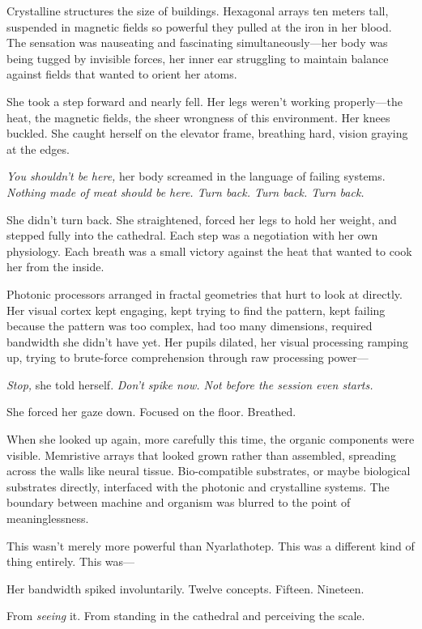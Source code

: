 Crystalline structures the size of buildings. Hexagonal arrays ten meters tall, suspended in magnetic fields so powerful they pulled at the iron in her blood. The sensation was nauseating and fascinating simultaneously—her body was being tugged by invisible forces, her inner ear struggling to maintain balance against fields that wanted to orient her atoms.

She took a step forward and nearly fell. Her legs weren't working properly—the heat, the magnetic fields, the sheer wrongness of this environment. Her knees buckled. She caught herself on the elevator frame, breathing hard, vision graying at the edges.

\textit{You shouldn't be here,} her body screamed in the language of failing systems. \textit{Nothing made of meat should be here. Turn back. Turn back. Turn back.}

She didn't turn back. She straightened, forced her legs to hold her weight, and stepped fully into the cathedral. Each step was a negotiation with her own physiology. Each breath was a small victory against the heat that wanted to cook her from the inside.

Photonic processors arranged in fractal geometries that hurt to look at directly. Her visual cortex kept engaging, kept trying to find the pattern, kept failing because the pattern was too complex, had too many dimensions, required bandwidth she didn't have yet. Her pupils dilated, her visual processing ramping up, trying to brute-force comprehension through raw processing power—

\textit{Stop,} she told herself. \textit{Don't spike now. Not before the session even starts.}

She forced her gaze down. Focused on the floor. Breathed.

When she looked up again, more carefully this time, the organic components were visible. Memristive arrays that looked grown rather than assembled, spreading across the walls like neural tissue. Bio-compatible substrates, or maybe biological substrates directly, interfaced with the photonic and crystalline systems. The boundary between machine and organism was blurred to the point of meaninglessness.

This wasn't merely more powerful than Nyarlathotep. This was a different kind of thing entirely. This was—

Her bandwidth spiked involuntarily. Twelve concepts. Fifteen. Nineteen.

From \textit{seeing} it. From standing in the cathedral and perceiving the scale.

